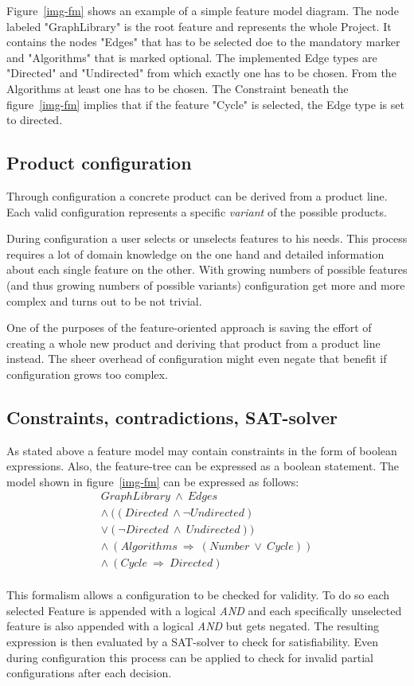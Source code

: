 Figure~\ref{img-fm} shows an example of a simple feature model diagram. The node labeled "GraphLibrary" is the root feature and represents the whole Project. It contains the nodes "Edges" that has to be selected doe to the mandatory marker and "Algorithms" that is marked optional. The implemented Edge types are "Directed" and "Undirected" from which exactly one has to be chosen. From the Algorithms at least one has to be chosen. The Constraint beneath the figure~\ref{img-fm} implies that if the feature "Cycle" is selected, the Edge type is set to directed.

\subsection{Product configuration}
Through configuration a concrete product can be derived from a product line. Each valid configuration represents a specific \textit{variant} of the possible products.

During configuration a user selects or unselects features to his needs. This process requires a lot of domain knowledge on the one hand and detailed information about each single feature on the other. With growing numbers of possible features (and thus growing numbers of possible variants) configuration get more and more complex and turns out to be not trivial.

One of the purposes of the feature-oriented approach is saving the effort of creating a whole new product and deriving that product from a product line instead. The sheer overhead of configuration might even negate that benefit if configuration grows too complex.

\subsection{Constraints, contradictions, SAT-solver}
As stated above a feature model may contain constraints in the form of boolean expressions. Also, the feature-tree can be expressed as a boolean statement. The model shown in figure~\ref{img-fm} can be expressed as follows:
\begin{equation}
\begin{split}
	GraphLibrary\ \wedge\ Edges\\
	\wedge\ ((Directed\ \wedge \neg Undirected)\\
	\vee (\neg Directed\ \wedge\ Undirected))\\
	\wedge\ (Algorithms\ \Rightarrow\ (Number\ \vee\ Cycle))\\
	\wedge\ (Cycle\ \Rightarrow\ Directed)
\end{split}
\end{equation}\\
This formalism allows a configuration to be checked for validity. To do so each selected Feature is appended with a logical \textit{AND} and each specifically unselected feature is also appended with a logical \textit{AND} but gets negated. The resulting expression is then evaluated by a SAT-solver to check for satisfiability. Even during configuration this process can be applied to check for invalid partial configurations after each decision.
